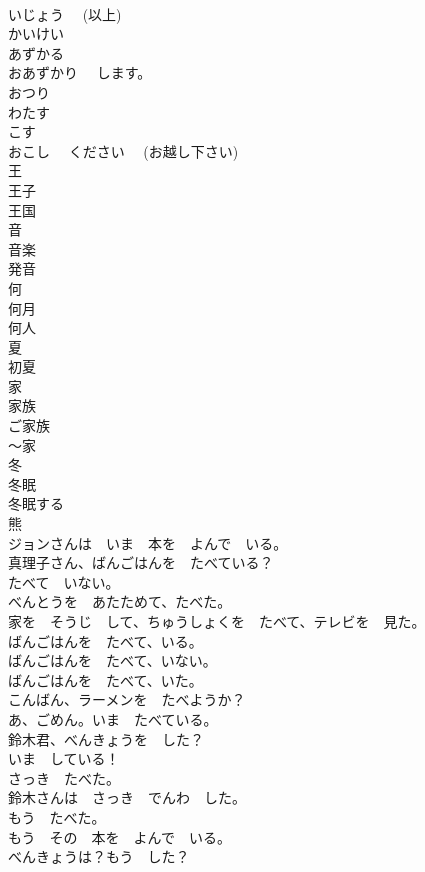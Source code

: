 \documentclass[8pt]{extreport}
\begin{document}
\begin{CJK}{UTF8}{min}
\\	いじょう　 (以上)	
\\	かいけい	
\\	あずかる	
\\	おあずかり　 します。	
\\	おつり	
\\	わたす	
\\	こす	
\\	おこし　 ください　 (お越し下さい)	
\\	王	
\\	王子	
\\	王国	
\\	音	
\\	音楽	
\\	発音	
\\	何	
\\	何月	
\\	何人	
\\	夏	
\\	初夏	
\\	家	
\\	家族	
\\	ご家族	
\\	～家	
\\	冬	
\\	冬眠	
\\	冬眠する	
\\	熊	
\\	ジョンさんは　いま　本を　よんで　いる。	
\\	真理子さん、ばんごはんを　たべている？	
\\	たべて　いない。	
\\	べんとうを　あたためて、たべた。	
\\	家を　そうじ　して、ちゅうしょくを　たべて、テレビを　見た。	
\\	ばんごはんを　たべて、いる。	
\\	ばんごはんを　たべて、いない。	
\\	ばんごはんを　たべて、いた。	
\\	こんばん、ラーメンを　たべようか？	
\\	あ、ごめん。いま　たべている。	
\\	鈴木君、べんきょうを　した？	
\\	いま　している！	
\\	さっき　たべた。	
\\	鈴木さんは　さっき　でんわ　した。	
\\	もう　たべた。	
\\	もう　その　本を　よんで　いる。	
\\	べんきょうは？もう　した？	

\end{CJK}
\end{document}
